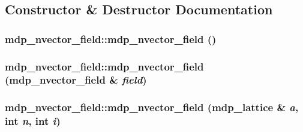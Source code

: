 \subsection{Constructor \& Destructor Documentation}
\hypertarget{classmdp__nvector__field_a528129f314282511fa8b910c09872972}{
\subsubsection[{mdp\_\-nvector\_\-field}]{\setlength{\rightskip}{0pt plus 5cm}mdp\_\-nvector\_\-field::mdp\_\-nvector\_\-field ()}}
\label{classmdp__nvector__field_a528129f314282511fa8b910c09872972}
\hypertarget{classmdp__nvector__field_a9f0e296ba904e19aa3065fb9df3680a4}{
\subsubsection[{mdp\_\-nvector\_\-field}]{\setlength{\rightskip}{0pt plus 5cm}mdp\_\-nvector\_\-field::mdp\_\-nvector\_\-field ({\bf mdp\_\-nvector\_\-field} \& {\em field})}}
\label{classmdp__nvector__field_a9f0e296ba904e19aa3065fb9df3680a4}
\hypertarget{classmdp__nvector__field_a0fce9d8001cc5244ea0182249d571007}{
\subsubsection[{mdp\_\-nvector\_\-field}]{\setlength{\rightskip}{0pt plus 5cm}mdp\_\-nvector\_\-field::mdp\_\-nvector\_\-field ({\bf mdp\_\-lattice} \& {\em a}, \/  int {\em n}, \/  int {\em i})}}
\label{classmdp__nvector__field_a0fce9d8001cc5244ea0182249d571007}


